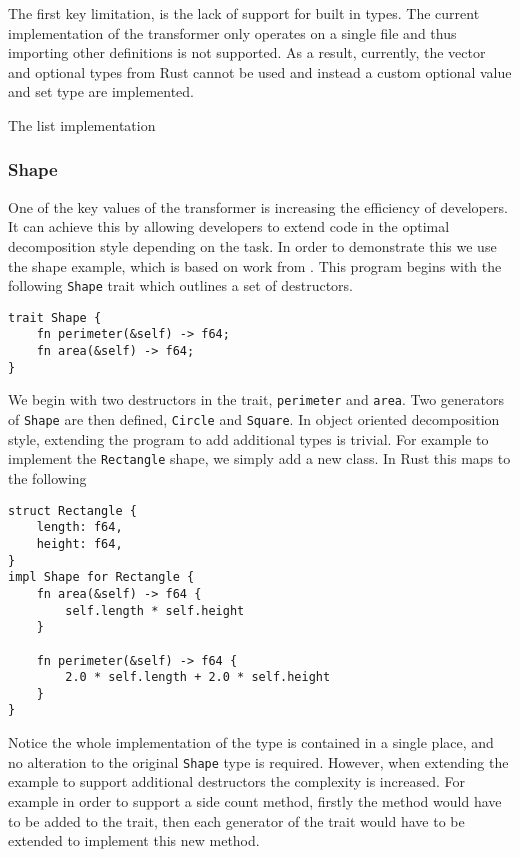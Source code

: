 \documentclass[ oneside,%
                    author={James Elgar},
                    degree={MEng},
                     title={Bidirectional transformer between functional and \\ object-oriented programming in Rust},
                  subtitle={}]{dissertation}
\newcommand{\rust}[1]{\texttt{#1}}
\begin{document}
The first key limitation, is the lack of support for built in types. The current implementation of the transformer only operates on a single file and thus importing other definitions is not supported. As a result, currently, the vector and optional types from Rust cannot be used and instead a custom optional value and set type are implemented.

The list implementation 
 
\subsubsection{Shape}

One of the key values of the transformer is increasing the efficiency of developers. It can achieve this by allowing developers to extend code in the optimal decomposition style depending on the task. In order to demonstrate this we use the shape example, which is based on work from \cite{oopdesign}. This program begins with the following \rust{Shape} trait which outlines a set of destructors. 

\begin{verbatim}
trait Shape {
    fn perimeter(&self) -> f64;
    fn area(&self) -> f64;
}
\end{verbatim}

We begin with two destructors in the trait, \rust{perimeter} and \rust{area}. Two generators of \rust{Shape} are then defined, \rust{Circle} and \rust{Square}. In object oriented decomposition style, extending the program to add additional types is trivial. For example to implement the \rust{Rectangle} shape, we simply add a new class. In Rust this maps to the following 

\begin{verbatim}
struct Rectangle {
    length: f64,
    height: f64,
}
impl Shape for Rectangle {
    fn area(&self) -> f64 {
        self.length * self.height
    }

    fn perimeter(&self) -> f64 {
        2.0 * self.length + 2.0 * self.height
    }
}
\end{verbatim}

Notice the whole implementation of the type is contained in a single place, and no alteration to the original \rust{Shape} type is required. However, when extending the example to support additional destructors the complexity is increased. For example in order to support a side count method, firstly the method would have to be added to the trait, then each generator of the trait would have to be extended to implement this new method.
\end{document}
